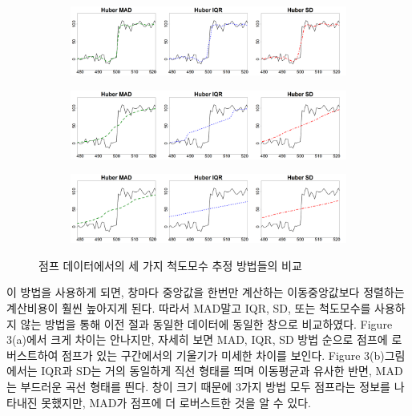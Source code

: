 \documentclass[letterpaper,12pt]{article}
\begin{document}
{\begin{figure}[H]
    \centering
    \begin{subfigure}[b]{\linewidth}
        \centering
        \includegraphics[width=\linewidth]{figures/3scale5.png}
        \caption{}
    \end{subfigure}
    
    \vspace{1em}
    
    \begin{subfigure}[b]{\linewidth}
        \centering
        \includegraphics[width=\linewidth]{figures/3scale51.png}
        \caption{}
    \end{subfigure}
        
    \vspace{1em}
    
    \begin{subfigure}[b]{\linewidth}
        \centering
        \includegraphics[width=\linewidth]{figures/3scale101.png}
        \caption{}
    \end{subfigure}
    
    \caption{점프 데이터에서의 세 가지 척도모수 추정 방법들의 비교}
    \label{fig:comparison}
\end{figure}
이 방법을 사용하게 되면, 창마다 중앙값을 한번만 계산하는 이동중앙값보다 정렬하는 계산비용이 훨씬 높아지게 된다. 따라서 MAD말고 IQR, SD, 또는 척도모수를 사용하지 않는 방법을 통해 이전 절과 동일한 데이터에 동일한 창으로 비교하였다.
Figure 3(a)에서 크게 차이는 안나지만, 자세히 보면 MAD, IQR, SD 방법 순으로 점프에 로버스트하여 점프가 있는 구간에서의 기울기가 미세한 차이를 보인다. Figure 3(b)그림에서는 IQR과 SD는 거의 동일하게 직선 형태를 띄며 이동평균과 유사한 반면, MAD는 부드러운 곡선 형태를 띈다. 창이 크기 때문에 3가지 방법 모두 점프라는 정보를 나타내진 못했지만, MAD가 점프에 더 로버스트한 것을 알 수 있다.

}
\end{document}
